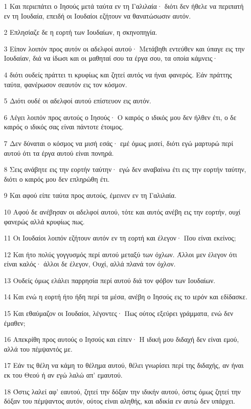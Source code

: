 \par 1 Και περιεπάτει ο Ιησούς μετά ταύτα εν τη Γαλιλαία· διότι δεν ήθελε να περιπατή εν τη Ιουδαία, επειδή οι Ιουδαίοι εζήτουν να θανατώσωσιν αυτόν.
\par 2 Επλησίαζε δε η εορτή των Ιουδαίων, η σκηνοπηγία.
\par 3 Είπον λοιπόν προς αυτόν οι αδελφοί αυτού· Μετάβηθι εντεύθεν και ύπαγε εις την Ιουδαίαν, διά να ίδωσι και οι μαθηταί σου τα έργα σου, τα οποία κάμνεις·
\par 4 διότι ουδείς πράττει τι κρυφίως και ζητεί αυτός να ήναι φανερός. Εάν πράττης ταύτα, φανέρωσον σεαυτόν εις τον κόσμον.
\par 5 Διότι ουδέ οι αδελφοί αυτού επίστευον εις αυτόν.
\par 6 Λέγει λοιπόν προς αυτούς ο Ιησούς· Ο καιρός ο ιδικός μου δεν ήλθεν έτι, ο δε καιρός ο ιδικός σας είναι πάντοτε έτοιμος.
\par 7 Δεν δύναται ο κόσμος να μισή εσάς· εμέ όμως μισεί, διότι εγώ μαρτυρώ περί αυτού ότι τα έργα αυτού είναι πονηρά.
\par 8 Σεις ανάβητε εις την εορτήν ταύτην· εγώ δεν αναβαίνω έτι εις την εορτήν ταύτην, διότι ο καιρός μου δεν επληρώθη έτι.
\par 9 Και αφού είπε ταύτα προς αυτούς, έμεινεν εν τη Γαλιλαία.
\par 10 Αφού δε ανέβησαν οι αδελφοί αυτού, τότε και αυτός ανέβη εις την εορτήν, ουχί φανερώς αλλά κρυφίως πως.
\par 11 Οι Ιουδαίοι λοιπόν εζήτουν αυτόν εν τη εορτή και έλεγον· Που είναι εκείνος;
\par 12 Και ήτο πολύς γογγυσμός περί αυτού μεταξύ των όχλων. Άλλοι μεν έλεγον ότι είναι καλός· άλλοι δε έλεγον, Ουχί, αλλά πλανά τον όχλον.
\par 13 Ουδείς όμως ελάλει παρρησία περί αυτού διά τον φόβον των Ιουδαίων.
\par 14 Και ενώ η εορτή ήτο ήδη περί τα μέσα, ανέβη ο Ιησούς εις το ιερόν και εδίδασκε.
\par 15 Και εθαύμαζον οι Ιουδαίοι, λέγοντες· Πως ούτος εξεύρει γράμματα, ενώ δεν έμαθεν;
\par 16 Απεκρίθη προς αυτούς ο Ιησούς και είπεν· Η ιδική μου διδαχή δεν είναι εμού, αλλά του πέμψαντός με.
\par 17 Εάν τις θέλη να κάμη το θέλημα αυτού, θέλει γνωρίσει περί της διδαχής, αν ήναι εκ του Θεού ή αν εγώ λαλώ απ' εμαυτού.
\par 18 Όστις λαλεί αφ' εαυτού, ζητεί την δόξαν την ιδικήν αυτού, όστις όμως ζητεί την δόξαν του πέμψαντος αυτόν, ούτος είναι αληθής, και αδικία εν αυτώ δεν υπάρχει.
